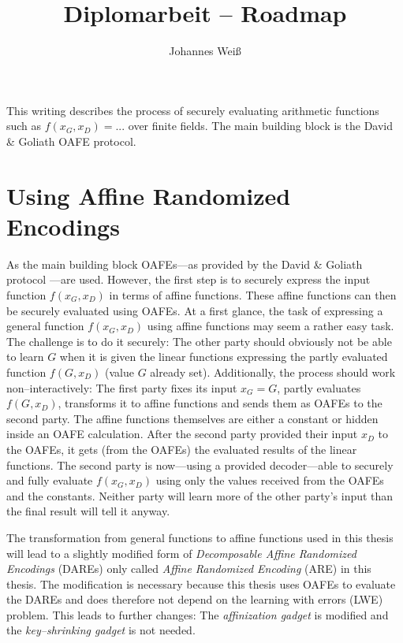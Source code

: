 \documentclass[12pt, a4paper]{article}
\title{Diplomarbeit -- Roadmap}
\author{Johannes Weiß}
\begin{document}
\maketitle

This writing describes the process of securely evaluating arithmetic functions
such as $f(x_G,x_D) = ...$ over finite fields. The main building block is the
David \& Goliath OAFE protocol\cite{davidgoliath}.

\section{Using Affine Randomized Encodings}
\label{sec:are}

As the main building block OAFEs---as provided by the David \& Goliath protocol
\cite{davidgoliath}---are used. However, the first step is to securely express
the input function $f(x_G, x_D)$ in terms of affine functions. These affine
functions can then be securely evaluated using OAFEs. At a first glance, the
task of expressing a general function $f(x_G, x_D)$ using affine functions may
seem a rather easy task. The challenge is to do it securely: The other party
should obviously not be able to learn $G$ when it is given the linear functions
expressing the partly evaluated function $f(G, x_D)$ (value $G$ already set).
Additionally, the process should work non--interactively: The first party fixes
its input $x_G = G$, partly evaluates $f(G, x_D)$, transforms it to affine
functions and sends them as OAFEs to the second party. The affine functions
themselves are either a constant or hidden inside an OAFE calculation. After the
second party provided their input $x_D$ to the OAFEs, it gets (from the OAFEs)
the evaluated results of the linear functions. The second party is now---using a
provided decoder---able to securely and fully evaluate $f(x_G, x_D)$ using only
the values received from the OAFEs and the constants. Neither party will learn
more of the other party's input than the final result will tell it anyway.

The transformation from general functions to affine functions used in this
thesis will lead to a slightly modified form of \emph{Decomposable Affine
Randomized Encodings} (DAREs) \cite{gac2012} only called \emph{Affine Randomized
Encoding} (ARE) in this thesis. The modification is necessary because this
thesis uses OAFEs to evaluate the DAREs and does therefore not depend on the
learning with errors (LWE) problem. This leads to further changes: The
\emph{affinization gadget} \cite{gac2012} is modified and the
\emph{key--shrinking gadget} \cite{gac2012} is not needed.
\end{document}
